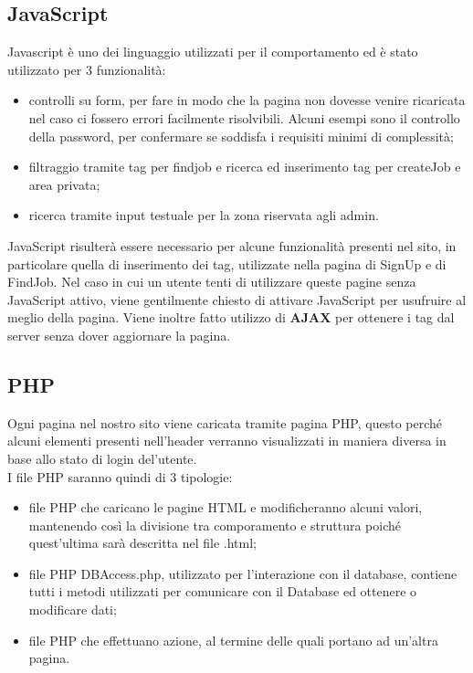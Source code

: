   \subsection{JavaScript}
  Javascript è uno dei linguaggio utilizzati per il comportamento ed è stato utilizzato per 3 funzionalità:
  \begin{itemize}
    \item controlli su form, per fare in modo che la pagina non dovesse venire ricaricata nel caso ci fossero errori facilmente risolvibili. Alcuni esempi sono il controllo della password, per confermare se soddisfa i requisiti minimi di complessità;
    \item filtraggio tramite tag per findjob e ricerca ed inserimento tag per createJob e area privata;
    \item ricerca tramite input testuale per la zona riservata agli admin.
  \end{itemize}
  JavaScript risulterà essere necessario per alcune funzionalità presenti nel sito, in particolare quella di inserimento dei tag, utilizzate nella pagina di SignUp e di FindJob. Nel caso in cui un utente tenti di utilizzare queste pagine senza 
  JavaScript attivo, viene gentilmente chiesto di attivare JavaScript per usufruire al meglio della pagina.
  Viene inoltre fatto utilizzo di \textbf{AJAX} per ottenere i tag dal server senza dover aggiornare la pagina.

  \subsection{PHP}
  Ogni pagina nel nostro sito viene caricata tramite pagina PHP, questo perché alcuni elementi presenti nell'header verranno visualizzati in maniera diversa in base allo stato di login del'utente. \\
  I file PHP saranno quindi di 3 tipologie:
  \begin{itemize}
    \item file PHP che caricano le pagine HTML e modificheranno alcuni valori, mantenendo così la divisione tra comporamento e struttura poiché quest'ultima sarà descritta nel file .html;
    \item file PHP DBAccess.php, utilizzato per l'interazione con il database, contiene tutti i metodi utilizzati per comunicare con il Database ed ottenere o modificare dati;
    \item file PHP che effettuano azione, al termine delle quali portano ad un'altra pagina.
  \end{itemize}

